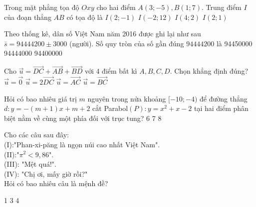 \begin{ex}%
Trong mặt phẳng tọa độ $Oxy$ cho hai điểm $A(3;-5),B(1;7)$. Trung điểm $I$ của đoạn thẳng $AB$ có tọa độ là
\choice
{$I(2;-1)$}
{$I(-2;12)$}
{$I(4;2)$}
{\True $I(2;1)$}
\end{ex}
\begin{ex}%
Theo thống kê, dân số Việt Nam năm 2016 được ghi lại như sau $\bar{s}=94444200\pm 3000$ (người). Số quy tròn của số gần đúng $94444200$ là
\choice
{}
{94450000}
{94444000}
{94400000}
\end{ex}
\begin{ex}%
Cho $\vec{u}=\overrightarrow{DC}+\overrightarrow{AB}+\overrightarrow{BD}$ với 4 điểm bất kì $A,B,C,D$. Chọn khẳng định đúng?
\choice
{$\vec{u}=\vec{0}$}
{$\vec{u}=2\overrightarrow{DC}$}
{\True $\vec{u}=\overrightarrow{AC}$}
{$\vec{u}=\overrightarrow{BC}$}
\end{ex}
\begin{ex}%
Hỏi có bao nhiêu giá trị $m$ nguyên trong nửa khoảng $[-10;-4)$ để đường thẳng $d:y=-(m+1)x+m+2$ cắt Parabol$(P):y=x^2+x-2$ tại hai điểm phân biệt nằm về cùng một phía đối với trục tung?
\choice
{6}
{}
{7}
{8}
\end{ex}
\begin{ex}%
Cho các câu sau đây:\\
(I):"Phan-xi-păng là ngọn núi cao nhất Việt Nam".\\
(II):"$\pi ^2 <9,86$".\\
(III): "Mệt quá!".\\
(IV): "Chị ơi, mấy giờ rồi?"\\
Hỏi có bao nhiêu câu là mệnh đề?


\choice
{1}
{3}
{4}
{}
\end{ex}
